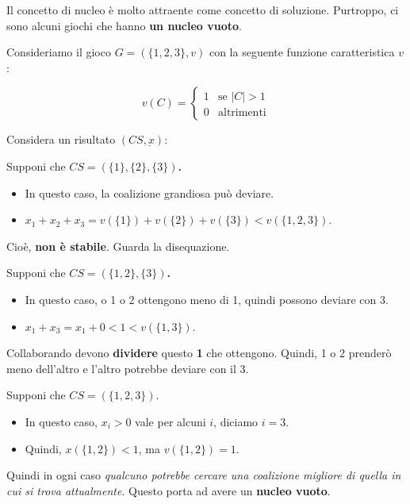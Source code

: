 \begin{definition}
    Il concetto di nucleo è molto attraente come concetto di soluzione. Purtroppo, ci sono alcuni giochi che
    hanno \textbf{un nucleo vuoto}.

    Consideriamo il gioco $G = (\{1, 2, 3\}, v)$ con la seguente funzione
    caratteristica $v$:

    $$
        v(C) =
        \begin{cases}
            1 & \text{se } |C| > 1 \\
            0 & \text{altrimenti}
        \end{cases}
    $$
\end{definition}

Considera un risultato $(CS, \underbar{x})$:

Supponi che \textbf{$CS = (\{1\}, \{2\}, \{3\})$.}
\begin{itemize}
    \item In questo caso, la coalizione grandiosa può deviare.
    \item $x_1 + x_2 + x_3 = v(\{1\}) + v(\{2\}) + v(\{3\}) < v(\{1, 2, 3\})$.
\end{itemize}

Cioè, \textbf{non è stabile}. Guarda la disequazione.

Supponi che \textbf{$CS = (\{1,2\}, \{3\})$.}
\begin{itemize}
    \item In questo caso, o 1 o 2 ottengono meno di 1, quindi possono deviare con 3.
    \item $x_1 + x_3 = x_1 + 0 < 1 < v(\{1, 3\})$.
\end{itemize}

Collaborando devono \textbf{dividere} questo \textbf{1} che ottengono. Quindi,
1 o 2 prenderò meno dell'altro e l'altro potrebbe deviare con il 3.

Supponi che \textbf{$CS = (\{1,2,3\})$}.
\begin{itemize}
    \item In questo caso, $x_i > 0$ vale per alcuni $i$, diciamo $i=3$.
    \item Quindi, $x(\{1,2\}) < 1$, ma $v(\{1,2\}) = 1$.
\end{itemize}\textbf{}

Quindi in ogni caso \textit{qualcuno potrebbe cercare una coalizione migliore
    di quella in cui si trova attualmente}. Questo porta ad avere un \textbf{nucleo
    vuoto}.

